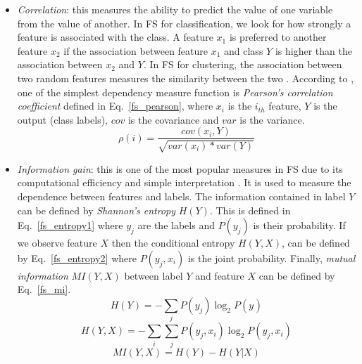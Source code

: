 \begin{itemize}
  \item \textit{Correlation}: this measures the ability to predict the value of one variable from the value of another. In FS for classification, we look for how strongly a feature is associated with the class. A feature $x_{1}$ is preferred to another feature $x_{2}$ if the association between feature $x_{1}$ and class $Y$ is higher than the association between $x_{2}$ and $Y$. In FS for clustering, the association between two random features measures the similarity between the two \citep{liu2005toward}. According to \citet{guyon2003introduction}, one of the simplest dependency measure function is \textit{Pearson's correlation coefficient} defined in Eq.~\ref{fs_pearson}, where $x_{i}$ is the $i_{th}$ feature, $Y$ is the output (class labels), $cov$ is the covariance and $var$ is the variance.
  \begin{equation}\label{fs_pearson}
    \rho(i) = \frac{cov(x_{i},Y)}{\sqrt{var(x_{i})*var(Y)}}
  \end{equation}
  \item \textit{Information gain}:  this is one of the most popular measures in FS due to its computational efficiency and simple interpretation \citep{tang2014feature}. It is used to measure the dependence between features and labels. The information contained in label $Y$ can be defined by \textit{Shannon's entropy} $H(Y)$. This is defined in Eq.~\ref{fs_entropy1} where $y_{j}$ are the labels and $P(y_{j})$ is their probability. If we observe feature $X$ then the conditional entropy $H(Y, X)$, can be defined by Eq.~\ref{fs_entropy2} where $P(y_{j},x_{i})$ is the joint probability. Finally, \textit{mutual information} $MI(Y,X)$ between label $Y$ and feature $X$ can be defined by Eq.~\ref{fs_mi}.
  \begin{equation}\label{fs_entropy1}
    H(Y) = -\sum_j P(y_{j})\log_{2} P(y_{})
  \end{equation}  
  \begin{equation}\label{fs_entropy2}
    H(Y, X) = -\sum_i\sum_j P(y_{j},x_{i})\log_{2}P(y_{j},x_{i})
  \end{equation}
  \begin{equation}\label{fs_mi}
    MI(Y,X) = H(Y) - H(Y|X)
  \end{equation}
\end{itemize}

